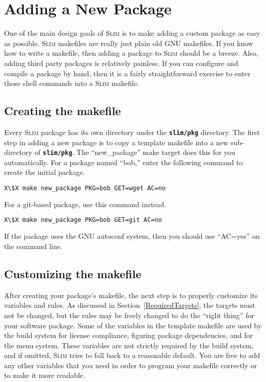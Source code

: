 \documentclass[a4paper,10pt]{article}
\newcommand{\slim}{\textsc{Slim}\xspace}
\newcommand{\fw}{\tt\bf}
\begin{document}
\section{Adding a New Package}

    One of the main design goals of \slim is to make adding a custom
    package as easy as possible. \slim makefiles are really just plain
    old GNU makefiles. If you know how to write a makefile, then
    adding a package to \slim should be a breeze. Also, adding third
    party packages is relatively painless. If you can configure and
    compile a package by hand, then it is a fairly straightforward
    exercise to enter those shell commands into a \slim makefile.

\subsection{Creating the makefile}\label{MakeNew}

    Every \slim package has its own directory under the {\fw slim/pkg}
    directory. The first step in adding a new package is to copy a
    template makefile into a new sub-directory of {\fw slim/pkg}. The
    ``new\_package'' make target does this for you automatically. For a
    package named ``bob,'' enter the following command to create the
    initial package.

\begin{lstlisting}[language=bash,escapechar=X]
X\$X make new_package PKG=bob GET=wget AC=no
\end{lstlisting}

    For a git-based package, use this command instead.

\begin{lstlisting}[language=bash,escapechar=X]
X\$X make new_package PKG=bob GET=git AC=no
\end{lstlisting}

    If the package uses the GNU autoconf system, then you should use
    ``AC=yes'' on the command line.

\subsection{Customizing the makefile}

    After creating your package's makefile, the next step is to
    properly customize its variables and rules. As discussed in
    Section~\ref{RequiredTargets}, the targets must not be changed,
    but the rules may be freely changed to do the ``right thing'' for
    your software package. Some of the variables in the template
    makefile are used by the build system for license compliance,
    figuring package dependencies, and for the menu system. These
    variables are not strictly required by the build system, and if
    omitted, \slim tries to fall back to a reasonable default. You are
    free to add any other variables that you need in order to program
    your makefile correctly or to make it more readable.
\end{document}
